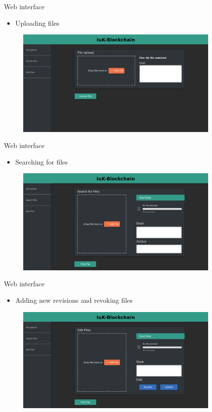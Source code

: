 \documentclass[10pt]{beamer}
\begin{document}
\begin{frame}{Web interface}
	\begin{itemize}
		\item Uploading files
	\end{itemize}
	\begin{figure}
		\includegraphics[width=0.9\textwidth]{images/upload.png}
	\end{figure}
\end{frame}

\begin{frame}{Web interface}
	\begin{itemize}
		\item Searching for files
	\end{itemize}
	\begin{figure}
		\includegraphics[width=0.9\textwidth]{images/search.png}
	\end{figure}
\end{frame}

\begin{frame}{Web interface}
	\begin{itemize}
		\item Adding new revisions and revoking files
	\end{itemize}
	\begin{figure}
		\includegraphics[width=0.9\textwidth]{images/edit.png}
	\end{figure}
\end{frame}

\end{document}

